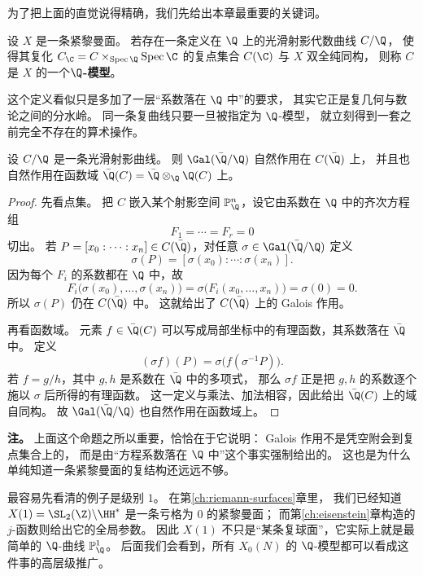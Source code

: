 为了把上面的直觉说得精确，我们先给出本章最重要的关键词。

\begin{definition}[$\Q$-模型]
\label{def:ch07-q-model}
设 $X$ 是一条紧黎曼面。
若存在一条定义在 $\Q$ 上的光滑射影代数曲线 $C/\Q$，
使得其复化 $C_{\C}=C\times_{\operatorname{Spec}\Q}\operatorname{Spec}\C$ 的复点集合
$C(\C)$ 与 $X$ 双全纯同构，
则称 $C$ 是 $X$ 的一个\textbf{$\Q$-模型}。
\end{definition}

这个定义看似只是多加了一层“系数落在 $\Q$ 中”的要求，
其实它正是复几何与数论之间的分水岭。
同一条复曲线只要一旦被指定为 $\Q$-模型，
就立刻得到一套之前完全不存在的算术操作。

\begin{proposition}
\label{prop:ch07-galois-action}
设 $C/\Q$ 是一条光滑射影曲线。
则 $\Gal(\bar\Q/\Q)$ 自然作用在 $C(\bar\Q)$ 上，
并且也自然作用在函数域 $\bar\Q(C)=\bar\Q\otimes_{\Q}\Q(C)$ 上。
\end{proposition}

\begin{proof}
先看点集。
把 $C$ 嵌入某个射影空间 $\mathbb P^n_{\Q}$，设它由系数在 $\Q$ 中的齐次方程组
\[
  F_1=\cdots=F_r=0
\]
切出。
若 $P=[x_0:\cdots:x_n]\in C(\bar\Q)$，对任意 $\sigma\in\Gal(\bar\Q/\Q)$ 定义
\[
  \sigma(P)=[\sigma(x_0):\cdots:\sigma(x_n)].
\]
因为每个 $F_i$ 的系数都在 $\Q$ 中，故
\[
  F_i\bigl(\sigma(x_0),\dots,\sigma(x_n)\bigr)
  =\sigma\bigl(F_i(x_0,\dots,x_n)\bigr)=\sigma(0)=0.
\]
所以 $\sigma(P)$ 仍在 $C(\bar\Q)$ 中。
这就给出了 $C(\bar\Q)$ 上的 Galois 作用。

再看函数域。
元素 $f\in\bar\Q(C)$ 可以写成局部坐标中的有理函数，其系数落在 $\bar\Q$ 中。
定义
\[
  (\sigma f)(P)=\sigma\bigl(f(\sigma^{-1}P)\bigr).
\]
若 $f=g/h$，其中 $g,h$ 是系数在 $\bar\Q$ 中的多项式，
那么 $\sigma f$ 正是把 $g,h$ 的系数逐个施以 $\sigma$ 后所得的有理函数。
这一定义与乘法、加法相容，因此给出 $\bar\Q(C)$ 上的域自同构。
故 $\Gal(\bar\Q/\Q)$ 也自然作用在函数域上。
\end{proof}

\textbf{注。}
上面这个命题之所以重要，恰恰在于它说明：
Galois 作用不是凭空附会到复点集合上的，
而是由“方程系数落在 $\Q$ 中”这个事实强制给出的。
这也是为什么单纯知道一条紧黎曼面的复结构还远远不够。

最容易先看清的例子是级别 $1$。
在第\ref{ch:riemann-surfaces}章里，
我们已经知道 $X(1)=\SL_2(\Z)\backslash \HH^*$ 是一条亏格为 $0$ 的紧黎曼面；
而第\ref{ch:eisenstein}章构造的 $j$-函数则给出它的全局参数。
因此 $X(1)$ 不只是“某条复球面”，它实际上就是最简单的 $\Q$-曲线 $\mathbb P^1_{\Q}$。
后面我们会看到，所有 $X_0(N)$ 的 $\Q$-模型都可以看成这件事的高层级推广。

